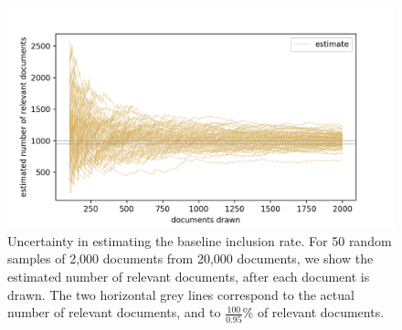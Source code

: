 \documentclass{bmcart}
\begin{document}
	\begin{figure}
	\includegraphics[width=\linewidth]{../images/bir_sampling_noci.png}
	\caption{Uncertainty in estimating the baseline inclusion rate. For 50 random samples of 2,000 documents from 20,000 documents, we show the estimated number of relevant documents, after each document is drawn. The two horizontal grey  lines correspond to the actual number of relevant documents, and to $\frac{100}{0.95}$\% of relevant documents.
		\label{bir-sampling}
	}
\end{figure}
\end{document}
